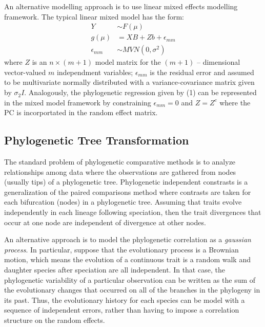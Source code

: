 \documentclass[12pt]{article}
\begin{document}
An alternative modelling approach is to use linear mixed effects modelling framework.
The typical linear mixed model has the form:
\begin{align}
Y & \sim F(\mu) \\
g(\mu) & = XB + Zb + \epsilon_{mm} \\
\epsilon_{mm} & \sim MVN(0,\sigma^2)
\end{align}
where $Z$ is an $n \times (m+1)$ model matrix for the $(m+1)$ -- dimensional vector-valued $m$ independment variables; $\epsilon_{mm}$ is the residual error and assumed to be multivariate normally distributed with a variance-covariance matrix given by $\sigma_{2}I$.
Analogously, the phylogenetic regression given by (1) can be represented in the mixed model framework by constraining $\epsilon_{mm} = 0$ and $Z=Z^{c}$ where the PC is incorportated in the random effect matrix. 

\subsection{Phylogenetic Tree Transformation}
The standard problem of phylogenetic comparative methods is to analyze relationships among data where the observations are gathered from nodes (usually tips) of a phylogenetic tree.
Phylogenetic independent constrasts is a generalization of the paired comparisons method where contrasts are taken for each bifurcation (nodes) in a phylogenetic tree. 
Assuming that traits evolve independently in each lineage following speciation, then the trait divergences that occur at one node are independent of divergence at other nodes.  

An alternative approach is to model the phylogenetic correlation as a \textit{gaussian process}. 
In particular, suppose that the evolutionary process is a Brownian motion, which means the evolution of a continuous trait is a random walk and daughter species after speciation are all independent.  
In that case, the phylogenetic variability of a particular observation can be written as the sum of the evolutionary changes that occurred on all of the branches in the phylogeny in its past. 
Thus, the evolutionary history for each species can be model with a sequence of independent errors, rather than having to impose a correlation structure on the random effects. 
\end{document}
